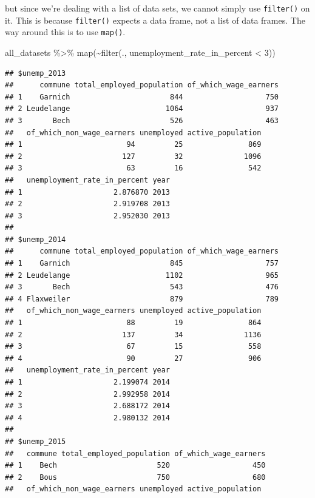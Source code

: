 \documentclass[
]{article}
\newenvironment{Shaded}{\begin{snugshade}}{\end{snugshade}}
\newcommand{\DecValTok}[1]{\textcolor[rgb]{0.00,0.00,0.81}{#1}}
\newcommand{\FunctionTok}[1]{\textcolor[rgb]{0.00,0.00,0.00}{#1}}
\newcommand{\NormalTok}[1]{#1}
\newcommand{\SpecialCharTok}[1]{\textcolor[rgb]{0.00,0.00,0.00}{#1}}
\begin{document}
but since we're dealing with a list of data sets, we cannot simply use \texttt{filter()} on it. This is because
\texttt{filter()} expects a data frame, not a list of data frames. The way around this is to use \texttt{map()}.

\begin{Shaded}
\begin{Highlighting}[]
\NormalTok{all\_datasets }\SpecialCharTok{\%\textgreater{}\%}
  \FunctionTok{map}\NormalTok{(}\SpecialCharTok{\textasciitilde{}}\FunctionTok{filter}\NormalTok{(., unemployment\_rate\_in\_percent }\SpecialCharTok{\textless{}} \DecValTok{3}\NormalTok{))}
\end{Highlighting}
\end{Shaded}

\begin{verbatim}
## $unemp_2013
##      commune total_employed_population of_which_wage_earners
## 1    Garnich                       844                   750
## 2 Leudelange                      1064                   937
## 3       Bech                       526                   463
##   of_which_non_wage_earners unemployed active_population
## 1                        94         25               869
## 2                       127         32              1096
## 3                        63         16               542
##   unemployment_rate_in_percent year
## 1                     2.876870 2013
## 2                     2.919708 2013
## 3                     2.952030 2013
## 
## $unemp_2014
##      commune total_employed_population of_which_wage_earners
## 1    Garnich                       845                   757
## 2 Leudelange                      1102                   965
## 3       Bech                       543                   476
## 4 Flaxweiler                       879                   789
##   of_which_non_wage_earners unemployed active_population
## 1                        88         19               864
## 2                       137         34              1136
## 3                        67         15               558
## 4                        90         27               906
##   unemployment_rate_in_percent year
## 1                     2.199074 2014
## 2                     2.992958 2014
## 3                     2.688172 2014
## 4                     2.980132 2014
## 
## $unemp_2015
##   commune total_employed_population of_which_wage_earners
## 1    Bech                       520                   450
## 2    Bous                       750                   680
##   of_which_non_wage_earners unemployed active_population

\end{verbatim}
\end{document}
